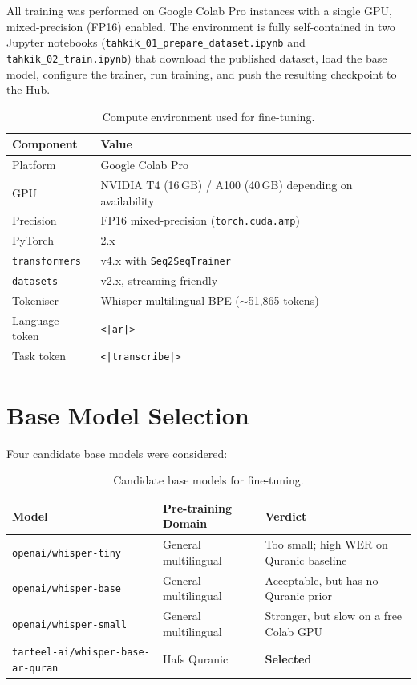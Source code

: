 \documentclass[12pt,a4paper]{report}
\begin{document}
All training was performed on Google Colab Pro instances with a single
GPU, mixed-precision (FP16) enabled. The environment is fully
self-contained in two Jupyter notebooks (\texttt{tahkik\_01\_prepare\_dataset.ipynb} and
\texttt{tahkik\_02\_train.ipynb}) that download the published dataset,
load the base model, configure the trainer, run training, and push the
resulting checkpoint to the Hub.

\begin{table}[H]
  \centering
  \caption{Compute environment used for fine-tuning.}
  \label{tab:mt_env}
  \renewcommand{\arraystretch}{1.3}
  \begin{tabular}{lp{8.5cm}}
    \toprule
    \textbf{Component} & \textbf{Value} \\
    \midrule
    Platform & Google Colab Pro \\
    GPU      & NVIDIA T4 (16\,GB) / A100 (40\,GB) depending on availability \\
    Precision & FP16 mixed-precision (\texttt{torch.cuda.amp}) \\
    PyTorch  & 2.x \\
    \texttt{transformers} & v4.x with \texttt{Seq2SeqTrainer} \\
    \texttt{datasets} & v2.x, streaming-friendly \\
    Tokeniser & Whisper multilingual BPE ($\sim$51{,}865 tokens) \\
    Language token & \texttt{<|ar|>} \\
    Task token & \texttt{<|transcribe|>} \\
    \bottomrule
  \end{tabular}
\end{table}

\section{Base Model Selection}

Four candidate base models were considered:

\begin{table}[H]
  \centering
  \caption{Candidate base models for fine-tuning.}
  \label{tab:mt_base_candidates}
  \renewcommand{\arraystretch}{1.3}
  \begin{tabular}{lll}
    \toprule
    \textbf{Model} & \textbf{Pre-training Domain} & \textbf{Verdict} \\
    \midrule
    \texttt{openai/whisper-tiny}  & General multilingual & Too small; high WER on Quranic baseline \\
    \texttt{openai/whisper-base}  & General multilingual & Acceptable, but has no Quranic prior \\
    \texttt{openai/whisper-small} & General multilingual & Stronger, but slow on a free Colab GPU \\
    \texttt{tarteel-ai/whisper-base-ar-quran} & Hafs Quranic & \textbf{Selected} \\
    \bottomrule
  \end{tabular}
\end{table}
\end{document}
